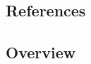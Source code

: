 \clearpage

\subsection{References}


\printbibliography

\clearpage

\subsection{Overview}

\tableofcontents

